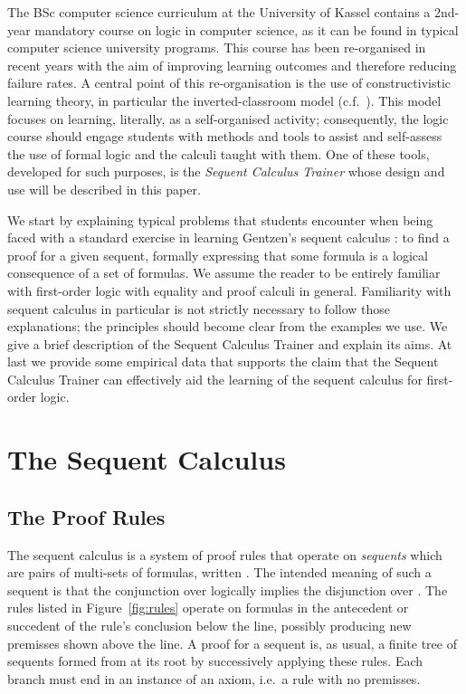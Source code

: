 \documentclass[a4paper,UKenglish]{lipics}
\begin{document}
The BSc computer science curriculum at the University of Kassel contains a 2nd-year mandatory course on logic in computer science, as it can be found
in typical computer science university programs. This course has been re-organised in recent years with the aim of improving learning
outcomes and therefore reducing failure rates. A central point of this re-organisation is the use of constructivistic learning theory, in particular 
the inverted-classroom model (c.f.\ \cite{LPT2000}). This model focuses on learning, literally, as a self-organised activity; consequently, the logic 
course should engage students with methods and tools to assist and self-assess the use of formal logic and the calculi taught with them. One of these 
tools, developed for such purposes, is the \emph{Sequent Calculus Trainer} whose design and use will be described in this paper.

We start by explaining typical problems that students encounter when being faced with a standard exercise in learning Gentzen's sequent calculus
\cite{Gentzen35}: to find a proof for a given sequent, formally expressing that some formula is a logical consequence of a set of formulas. We assume 
the reader to be entirely familiar with first-order logic with equality \cite{eft_logic_book84} and proof calculi in general. Familiarity with 
sequent calculus in particular is not strictly necessary to follow those explanations; the principles should become clear from the examples we
use. We give a brief description of the Sequent Calculus Trainer and explain its aims. At last we provide some empirical data
that supports the claim that the Sequent Calculus Trainer can effectively aid the learning of the sequent calculus for first-order logic.



\section{The Sequent Calculus}

\subsection{The Proof Rules}
The sequent calculus is a system of proof rules that operate on \emph{sequents} which are pairs of multi-sets of formulas, written 
. The intended meaning of such a sequent is that the conjunction over  logically implies the disjunction
over . The rules listed in Figure~\ref{fig:rules} operate on formulas in the antecedent  or succedent  of the rule's 
conclusion below the line, possibly producing new premisses shown above the line. A proof for a sequent  is, as 
usual, a finite tree of sequents formed from  at its root by successively applying these rules. Each branch must end in an
instance of an axiom, i.e.\ a rule with no premisses.
\end{document}
